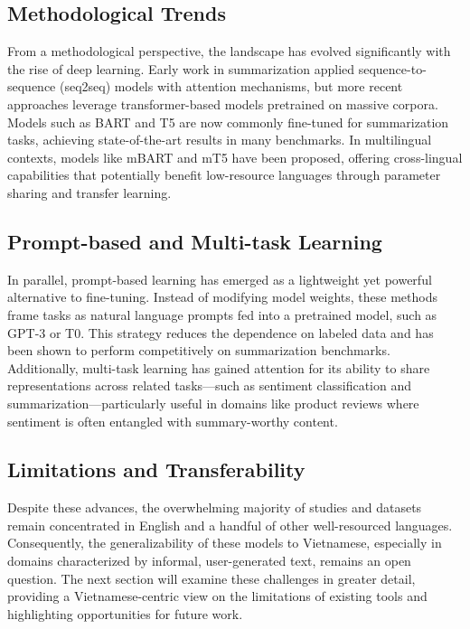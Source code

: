 \documentclass{article}
\begin{document}
\subsection{Methodological Trends}

From a methodological perspective, the landscape has evolved significantly with the rise of deep learning. Early work in summarization applied sequence-to-sequence (seq2seq) models with attention mechanisms, but more recent approaches leverage transformer-based models pretrained on massive corpora. Models such as BART and T5 are now commonly fine-tuned for summarization tasks, achieving state-of-the-art results in many benchmarks. In multilingual contexts, models like mBART and mT5 have been proposed, offering cross-lingual capabilities that potentially benefit low-resource languages through parameter sharing and transfer learning.

\subsection{Prompt-based and Multi-task Learning}

In parallel, prompt-based learning has emerged as a lightweight yet powerful alternative to fine-tuning. Instead of modifying model weights, these methods frame tasks as natural language prompts fed into a pretrained model, such as GPT-3 or T0. This strategy reduces the dependence on labeled data and has been shown to perform competitively on summarization benchmarks. Additionally, multi-task learning has gained attention for its ability to share representations across related tasks—such as sentiment classification and summarization—particularly useful in domains like product reviews where sentiment is often entangled with summary-worthy content.

\subsection{Limitations and Transferability}

Despite these advances, the overwhelming majority of studies and datasets remain concentrated in English and a handful of other well-resourced languages. Consequently, the generalizability of these models to Vietnamese, especially in domains characterized by informal, user-generated text, remains an open question. The next section will examine these challenges in greater detail, providing a Vietnamese-centric view on the limitations of existing tools and highlighting opportunities for future work.
\end{document}
